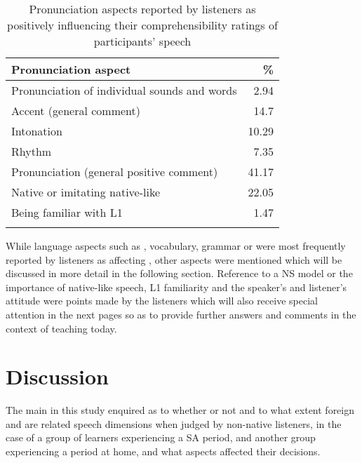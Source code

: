 \documentclass[output=paper]{langsci/langscibook}
\begin{document}
\begin{table}
\caption{Pronunciation aspects reported by listeners as positively influencing their comprehensibility ratings of participants’ speech}
\label{tab:delrio:6}

\begin{tabularx}{\textwidth}{Qr}
\lsptoprule
\bfseries Pronunciation aspect & \bfseries \%\\
\midrule 
Pronunciation of individual sounds and words & 2.94\\
Accent (general comment) & 14.7\\
Intonation & 10.29\\
Rhythm & 7.35\\
Pronunciation (general positive comment) & 41.17\\
Native or imitating native-like  & 22.05\\
Being familiar with {L1}  & 1.47 \\
\lspbottomrule
\end{tabularx}
\end{table}

\newpage 
While language aspects such as , vocabulary, grammar or  were most frequently reported by listeners as affecting , other aspects were mentioned which will be discussed in more detail in the following section. Reference to a NS model or the importance of native-like speech, {L1} familiarity and the speaker’s and listener’s attitude were points made by the listeners which will also receive special attention in the next pages so as to provide further answers and comments in the context of   teaching today.


\section{Discussion}
\largerpage
The main  in this study enquired as to whether or not and to what extent foreign  and  are related speech dimensions when judged by non-native listeners, in the case of a group of  learners experiencing a SA period, and another group experiencing a  period at home, and what aspects affected their decisions. 
\end{document}
